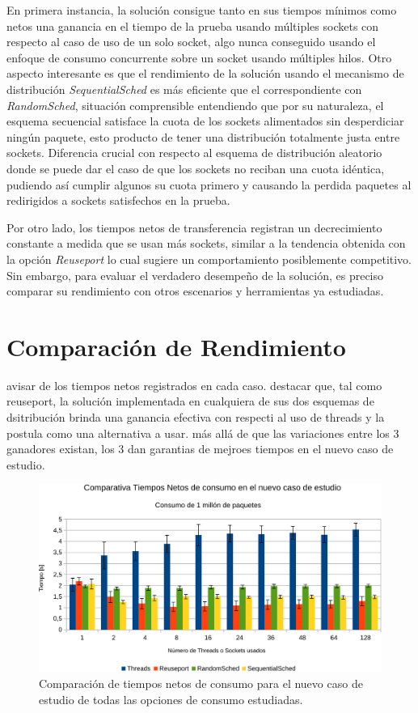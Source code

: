En primera instancia, la solución consigue tanto en sus tiempos mínimos como netos una ganancia en el tiempo de la prueba usando múltiples sockets con respecto al caso de uso de un solo socket, algo nunca conseguido usando el enfoque de consumo concurrente sobre un socket usando múltiples hilos. Otro aspecto interesante es que el rendimiento de la solución usando el mecanismo de distribución \emph{SequentialSched} es más eficiente que el correspondiente con \emph{RandomSched}, situación comprensible entendiendo que por su naturaleza, el esquema secuencial satisface la cuota de los sockets alimentados sin desperdiciar ningún paquete, esto producto de tener una distribución totalmente justa entre sockets. Diferencia crucial con respecto al esquema de distribución aleatorio donde se puede dar el caso de que los sockets no reciban una cuota idéntica, pudiendo así cumplir algunos su cuota primero y causando la perdida paquetes al redirigidos a sockets satisfechos en la prueba.

Por otro lado, los tiempos netos de transferencia registran un decrecimiento constante a medida que se usan más sockets, similar a la tendencia obtenida con la opción \emph{Reuseport} lo cual sugiere un comportamiento posiblemente competitivo. Sin embargo, para evaluar el verdadero desempeño de la solución, es preciso comparar su rendimiento con otros escenarios y herramientas ya estudiadas.

\section{Comparación de Rendimiento}

avisar de los tiempos netos registrados en cada caso. destacar que, tal como reuseport, la solución implementada en cualquiera de sus dos esquemas de dsitribución brinda una ganancia efectiva con respecti al uso de threads y la postula como una alternativa a usar. más allá de que las variaciones entre los 3 ganadores existan, los 3 dan garantias de mejroes tiempos en el nuevo caso de estudio.

\begin{figure}[!h]
	\centering
	\includegraphics[scale=.6]{resultados/modulovstodos1-crop.pdf}
	\caption{Comparación de tiempos netos de consumo para el nuevo caso de estudio de todas las opciones de consumo estudiadas.}
	\label{fig:resultadoMiModulovsTodos}
\end{figure}

